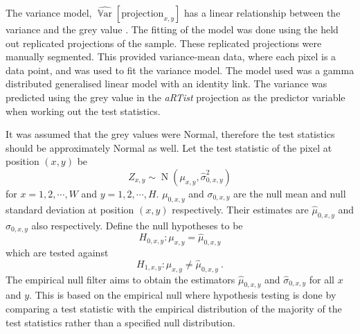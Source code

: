 \documentclass{proc}
\DeclareMathOperator{\variance}{\mathbb{V}ar}
\DeclareMathOperator{\normal}{N}
\begin{document}
The variance model, $\widehat{\variance}\left[\text{projection}_{x,y}\right]$ has a linear relationship between the variance and the grey value \citep{yang2010noise}. The fitting of the model was done using the held out replicated projections of the sample. These replicated projections were manually segmented. This provided variance-mean data, where each pixel is a data point, and was used to fit the variance model. The model used was a gamma distributed generalised linear model \citep{nelder1972generalized, mccullagh1984generalized} with an identity link. The variance was predicted using the grey value in the \emph{aRTist} projection as the predictor variable when working out the test statistics.

It was assumed that the grey values were Normal, therefore the test statistics should be approximately Normal as well. Let the test statistic of the pixel at position $(x,y)$ be
\begin{equation}
Z_{x,y}\sim\normal(\mu_{x,y},\widehat{\sigma}_{0,x,y}^2)
\end{equation}
for $x=1,2,\cdots,W$ and $y=1,2,\cdots,H$. $\mu_{0,x,y}$ and $\sigma_{0,x,y}$ are the null mean and null standard deviation at position $(x,y)$ respectively. Their estimates are $\widehat{\mu}_{0,x,y}$ and $\widehat{\sigma}_{0,x,y}$ also respectively. Define the null hypotheses to be
\begin{equation}
  H_{0,x,y}:\mu_{x,y}=\widehat{\mu}_{0,x,y}
\end{equation}
which are tested against
\begin{equation}
  H_{1,x,y}:\mu_{x,y}\neq\widehat{\mu}_{0,x,y} \ .
\end{equation}
The empirical null filter aims to obtain the estimators $\widehat{\mu}
_{0,x,y}$ and $\widehat{\sigma}_{0,x,y}$ for all $x$ and $y$. This is based on the empirical null \citep{efron2004large} where hypothesis testing is done by comparing a test statistic with the empirical distribution of the majority of the test statistics rather than a specified null distribution.
\end{document}
